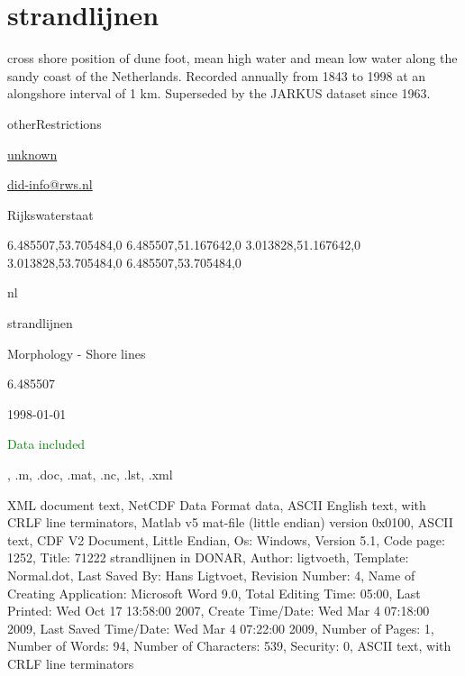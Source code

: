 \documentclass[9]{report}
\begin{document}
\section{ strandlijnen }
\begin{description}
  \setlength{\itemsep}{4pt}
  \setlength{\parskip}{2pt}
  \setlength{\parsep}{2pt}
  \item[Abstract]  cross shore position of dune foot, mean high water and mean low water along the sandy coast of the Netherlands.  Recorded annually from 1843 to 1998 at an alongshore interval of 1 km. Superseded by the JARKUS dataset since 1963. 
  \item[Access constraints] otherRestrictions
  \item[Author email] \href{mailto:unknown}{unknown}
  \item[Author organization] 
  \item[Contact email] \href{mailto:did-info@rws.nl}{did-info@rws.nl}
  \item[Contact organization] Rijkswaterstaat
  \item[Coordinates] 6.485507,53.705484,0
6.485507,51.167642,0
3.013828,51.167642,0
3.013828,53.705484,0
6.485507,53.705484,0
  \item[Country] nl
  \item[Dataset] strandlijnen
  \item[Datatype] Morphology - Shore lines
  \item[EastBoundLongitude] 6.485507
  \item[End time] 1998-01-01
  \item[Extract] \textcolor{green}{Data included}
  \item[File extensions] , .m, .doc, .mat, .nc, .lst, .xml
  \item[File types] XML  document text, NetCDF Data Format data, ASCII English text, with CRLF line terminators, Matlab v5 mat-file (little endian) version 0x0100, ASCII text, CDF V2 Document, Little Endian, Os: Windows, Version 5.1, Code page: 1252, Title: 71222 strandlijnen in DONAR, Author: ligtvoeth, Template: Normal.dot, Last Saved By: Hans Ligtvoet, Revision Number: 4, Name of Creating Application: Microsoft Word 9.0, Total Editing Time: 05:00, Last Printed: Wed Oct 17 13:58:00 2007, Create Time/Date: Wed Mar  4 07:18:00 2009, Last Saved Time/Date: Wed Mar  4 07:22:00 2009, Number of Pages: 1, Number of Words: 94, Number of Characters: 539, Security: 0, ASCII text, with CRLF line terminators

\end{description}
\end{document}
